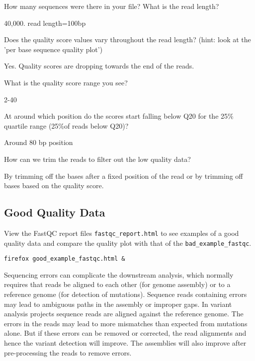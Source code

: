 \begin{questions}
How many sequences were there in your file? What is the read length?
\begin{answer}
40,000. read length=100bp
\end{answer}

Does the quality score values vary throughout the read length?
(hint: look at the 'per base sequence quality plot')
\begin{answer}
Yes. Quality scores are dropping towards the end of the reads.
\end{answer}

What is the quality score range you see?
\begin{answer}
2-40
\end{answer}

At around which position do the scores start falling below Q20 for the 25\% quartile range (25\%of reads below Q20)? 
\begin{answer}
Around 80 bp position
\end{answer}


How can we trim the reads to filter out the low quality data?
\begin{answer}
By trimming off the bases after a fixed position of the read or by trimming off
bases based on the quality score.
\end{answer}
\end{questions}

\begin{bonus}
\subsection{Good Quality Data}
View the FastQC report files \texttt{fastqc\_report.html} to see examples of a good
quality data and compare the quality plot with that of the \texttt{bad\_example\_fastqc}.

\begin{lstlisting}
firefox good_example_fastqc.html &
\end{lstlisting}
\end{bonus}

\begin{note}
Sequencing errors can complicate the downstream analysis, which normally
requires that reads be aligned to each other (for genome assembly) or to a
reference genome (for detection of mutations). Sequence reads containing errors
may lead to ambiguous paths in the assembly or improper gaps. In variant
analysis projects sequence reads are aligned against the reference genome. The
errors in the reads may lead to more mismatches than expected from
mutations alone. But if these errors can be removed or corrected, the read
alignments and hence the variant detection will improve. The assemblies will also
improve after pre-processing the reads to remove errors.
\end{note}

